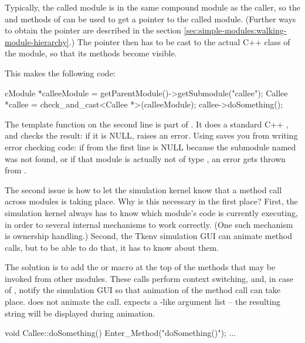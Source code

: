 Typically, the called module is in the same compound module as the caller,
so the  and  methods of
 can be used to get a  pointer to the
called module. (Further ways to obtain the pointer are described
in the section \ref{sec:simple-modules:walking-module-hierarchy}.)
The  pointer then has to be cast to the actual C++ class
of the module, so that its methods become visible.

This makes the following code:

\begin{cpp}
cModule *calleeModule = getParentModule()->getSubmodule("callee");
Callee *callee = check_and_cast<Callee *>(calleeModule);
callee->doSomething();
\end{cpp}

The  template function on the second line
is part of {\opp}. It does a standard C++ ,
and checks the result: if it is NULL,  raises an {\opp} error.
Using  saves you from writing error checking
code: if  from the first line is NULL because
the submodule named  was not found, or if that
module is actually not of type , an error gets thrown
from .

The second issue is how to let the simulation kernel know that
a method call across modules is taking place. Why is this necessary
in the first place? First, the simulation kernel always has to know which
module's code is currently executing, in order to several internal
mechanisms to work correctly. (One such mechanism is ownership handling.)
Second, the Tkenv simulation GUI can animate method calls,
but to be able to do that, it has to know about them.

The solution is to add the  or 
macro at the top of the methods that may be invoked from other
modules. These calls perform context switching, and, in case of
, notify the simulation GUI so that animation
of the method call can take place. 
does not animate the call.  expects a
-like argument list -- the resulting string will
be displayed during animation.

\begin{cpp}
void Callee::doSomething()
{
    Enter_Method("doSomething()");
    ...
}
\end{cpp}



